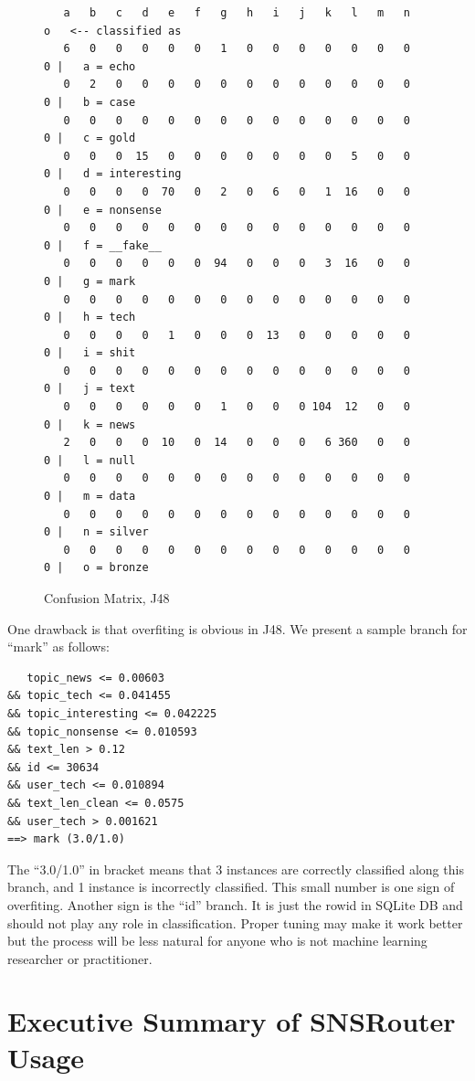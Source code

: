 \documentclass{sig-alternate}
\begin{document}
\begin{figure}[t!]
	\centering
\begin{Verbatim}
   a   b   c   d   e   f   g   h   i   j   k   l   m   n   o   <-- classified as
   6   0   0   0   0   0   1   0   0   0   0   0   0   0   0 |   a = echo
   0   2   0   0   0   0   0   0   0   0   0   0   0   0   0 |   b = case
   0   0   0   0   0   0   0   0   0   0   0   0   0   0   0 |   c = gold
   0   0   0  15   0   0   0   0   0   0   0   5   0   0   0 |   d = interesting
   0   0   0   0  70   0   2   0   6   0   1  16   0   0   0 |   e = nonsense
   0   0   0   0   0   0   0   0   0   0   0   0   0   0   0 |   f = __fake__
   0   0   0   0   0   0  94   0   0   0   3  16   0   0   0 |   g = mark
   0   0   0   0   0   0   0   0   0   0   0   0   0   0   0 |   h = tech
   0   0   0   0   1   0   0   0  13   0   0   0   0   0   0 |   i = shit
   0   0   0   0   0   0   0   0   0   0   0   0   0   0   0 |   j = text
   0   0   0   0   0   0   1   0   0   0 104  12   0   0   0 |   k = news
   2   0   0   0  10   0  14   0   0   0   6 360   0   0   0 |   l = null
   0   0   0   0   0   0   0   0   0   0   0   0   0   0   0 |   m = data
   0   0   0   0   0   0   0   0   0   0   0   0   0   0   0 |   n = silver
   0   0   0   0   0   0   0   0   0   0   0   0   0   0   0 |   o = bronze
\end{Verbatim}
	\caption{Confusion Matrix, J48}
	\label{fig:confmat_j48}
\end{figure}

One drawback is that overfiting is obvious in J48. 
We present a sample branch for ``mark''  as follows:
\begin{Verbatim}
   topic_news <= 0.00603 
&& topic_tech <= 0.041455
&& topic_interesting <= 0.042225 
&& topic_nonsense <= 0.010593 
&& text_len > 0.12 
&& id <= 30634 
&& user_tech <= 0.010894 
&& text_len_clean <= 0.0575
&& user_tech > 0.001621
==> mark (3.0/1.0)
\end{Verbatim}
The ``3.0/1.0'' in bracket means that 3 instances are correctly classified 
along this branch, and 1 instance is incorrectly classified. 
This small number is one sign of overfiting. 
Another sign is the ``id'' branch. 
It is just the rowid in SQLite DB and should not play any role in classification. 
Proper tuning may make it work better but the process will be less 
natural for anyone who is not machine learning researcher or practitioner. 

\section{Executive Summary of SNSRouter Usage}
\label{sec:Executive Summary of SNSRouter Usage}
\end{document}
